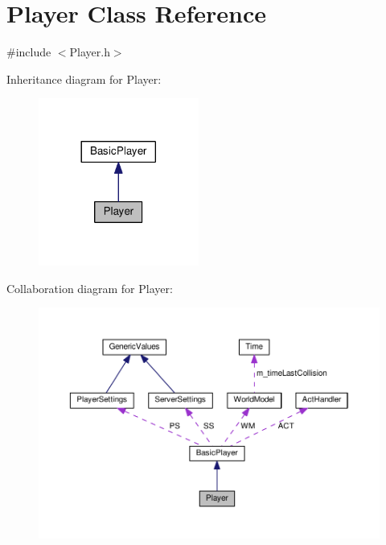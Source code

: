 \hypertarget{classPlayer}{}\section{Player Class Reference}
\label{classPlayer}


{\ttfamily \#include $<$Player.\+h$>$}



Inheritance diagram for Player\+:
\nopagebreak
\begin{figure}[H]
\begin{center}
\leavevmode
\includegraphics[width=149pt]{classPlayer__inherit__graph}
\end{center}
\end{figure}


Collaboration diagram for Player\+:
\nopagebreak
\begin{figure}[H]
\begin{center}
\leavevmode
\includegraphics[width=350pt]{classPlayer__coll__graph}
\end{center}
\end{figure}
